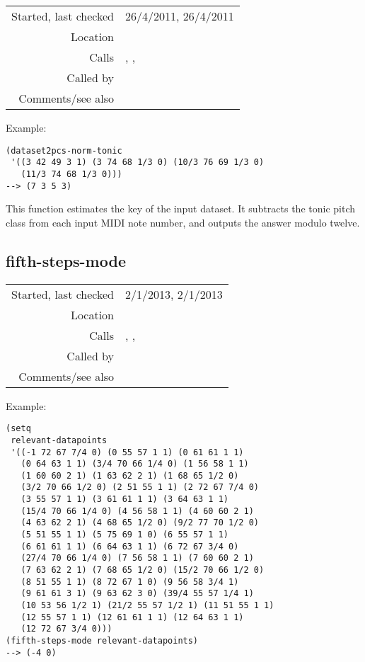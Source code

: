 \vspace{0.3cm}
\begin{tabular}{r|p{8cm}}
Started, last checked & 26/4/2011, 26/4/2011 \\
Location & \nameref{sec:keyscape} \\
Calls & \nameref{fun:key-correlations}, \nameref{fun:max-argmax},\newline \nameref{fun:nth-list-of-lists} \\
Called by & \\
Comments/see also & 
\end{tabular}

\vspace{0.5cm}
\noindent Example:
\begin{verbatim}
(dataset2pcs-norm-tonic
 '((3 42 49 3 1) (3 74 68 1/3 0) (10/3 76 69 1/3 0)
   (11/3 74 68 1/3 0)))
--> (7 3 5 3)
\end{verbatim}

\noindent This function estimates the key of the input
dataset. It subtracts the tonic pitch class from each
input MIDI note number, and outputs the answer modulo
twelve.


\subsection*{fifth-steps-mode}\label{fun:fifth-steps-mode}

\vspace{0.3cm}
\begin{tabular}{r|p{8cm}}
Started, last checked & 2/1/2013, 2/1/2013 \\
Location & \nameref{sec:keyscape} \\
Calls & \nameref{fun:key-correlations}, \nameref{fun:max-argmax},\newline \nameref{fun:nth-list-of-lists} \\
Called by & \nameref{fun:beat-rel-MNN-states} \\
Comments/see also & 
\end{tabular}

\vspace{0.5cm}
\noindent Example:
\begin{verbatim}
(setq
 relevant-datapoints
 '((-1 72 67 7/4 0) (0 55 57 1 1) (0 61 61 1 1)
   (0 64 63 1 1) (3/4 70 66 1/4 0) (1 56 58 1 1)
   (1 60 60 2 1) (1 63 62 2 1) (1 68 65 1/2 0)
   (3/2 70 66 1/2 0) (2 51 55 1 1) (2 72 67 7/4 0)
   (3 55 57 1 1) (3 61 61 1 1) (3 64 63 1 1)
   (15/4 70 66 1/4 0) (4 56 58 1 1) (4 60 60 2 1)
   (4 63 62 2 1) (4 68 65 1/2 0) (9/2 77 70 1/2 0)
   (5 51 55 1 1) (5 75 69 1 0) (6 55 57 1 1)
   (6 61 61 1 1) (6 64 63 1 1) (6 72 67 3/4 0)
   (27/4 70 66 1/4 0) (7 56 58 1 1) (7 60 60 2 1)
   (7 63 62 2 1) (7 68 65 1/2 0) (15/2 70 66 1/2 0)
   (8 51 55 1 1) (8 72 67 1 0) (9 56 58 3/4 1)
   (9 61 61 3 1) (9 63 62 3 0) (39/4 55 57 1/4 1)
   (10 53 56 1/2 1) (21/2 55 57 1/2 1) (11 51 55 1 1)
   (12 55 57 1 1) (12 61 61 1 1) (12 64 63 1 1)
   (12 72 67 3/4 0)))
(fifth-steps-mode relevant-datapoints)
--> (-4 0)
\end{verbatim}

